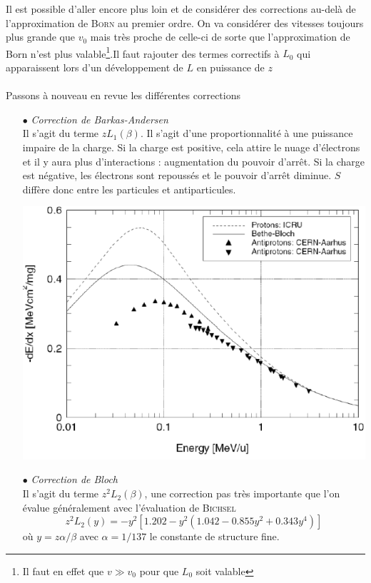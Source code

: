 Il est possible d'aller encore plus loin et de considérer des corrections au-delà de l'approximation
de \textsc{Born} au premier ordre.  On va considérer des vitesses toujours plus grande que $v_0$ mais
très proche de celle-ci de sorte que l'approximation de Born n'est plus valable\footnote{Il faut 
en effet que $v\gg v_0$ pour que $L_0$ soit valable}.Il faut rajouter des termes correctifs à 
$L_0$ qui apparaissent lors d'un développement de $L$ en puissance de $z$\ \\

\ \\

Passons à nouveau en revue les différentes corrections
\begin{itemize}
\item[$\bullet$] \textit{Correction de Barkas-Andersen}\ \\
Il s'agit du terme $zL_1(\beta)$. Il s'agit d'une proportionnalité à une puissance impaire de la 
charge. Si la charge est positive, cela attire le nuage d'électrons et il y aura plus d'interactions :
augmentation du pouvoir d'arrêt. Si la charge est négative, les électrons sont repoussés et le 
pouvoir d'arrêt diminue. $S$ diffère donc entre les particules et antiparticules.
\begin{center}
	\includegraphics[scale=0.5]{ch2/image5.png}
\end{center}
\item[$\bullet$] \textit{Correction de Bloch}\ \\
Il s'agit du terme $z^2L_2(\beta)$, une correction pas très importante que l'on évalue généralement
avec l'évaluation de \textsc{Bichsel}
\begin{equation}
z^2L_2(y) = -y^2[1.202-y^2(1.042-0.855y^2+0.343y^4)]
\end{equation}
où $y=z\alpha/\beta$ avec $\alpha = 1/137$ le constante de structure fine.
\end{itemize}

